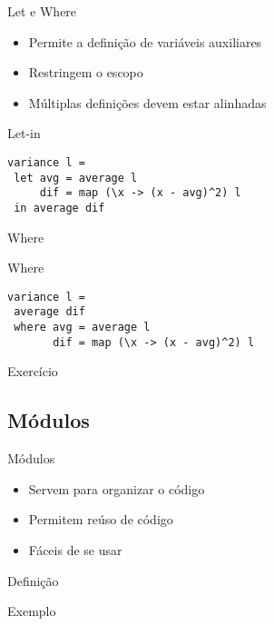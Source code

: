 \documentclass{beamer}
\begin{document}
		\begin{frame}[fragile]{Let e Where}
		 \begin{itemize}
		  \item Permite a definição de variáveis auxiliares
		  \item Restringem o escopo
		  \item Múltiplas definições devem estar alinhadas
		 \end{itemize}
		 \begin{block}{Let-in}
		  \begin{lstlisting}
variance l =
 let avg = average l
     dif = map (\x -> (x - avg)^2) l
 in average dif
		  \end{lstlisting}	  
		 \end{block}
		\end{frame}
		
		\begin{frame}[fragile]{Where}
		 \begin{block}{Where}
		  \begin{lstlisting}
variance l =
 average dif
 where avg = average l
       dif = map (\x -> (x - avg)^2) l
		  \end{lstlisting}
		 \end{block}		 
		\end{frame}
		
		\begin{frame}{Exercício}
		 
		\end{frame}
		
		\subsection{Módulos}
			\begin{frame}[fragile]{Módulos}
			 \begin{itemize}
			  \item Servem para organizar o código
			  \item Permitem reúso de código
			  \item Fáceis de se usar
			 \end{itemize}
			\end{frame}
			
			\begin{frame}[fragile]{Definição}
			 \begin{block}{Exemplo}
			  
			 \end{block}
			\end{frame}
			
\end{document}
